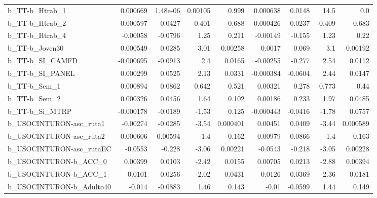\begin{tabular}{lrrrrrrrr}
b\_TT-b\_Htrab\_1             &    0.000669 &     1.48e-06 &  0.00105 &    0.999 &   0.000638 &      0.0148 &         14.5 &           0.0 \\
b\_TT-b\_Htrab\_2             &    0.000597 &       0.0427 &   -0.401 &    0.688 &   0.000426 &      0.0237 &       -0.409 &         0.683 \\
b\_TT-b\_Htrab\_4             &    -0.00058 &      -0.0796 &     1.25 &    0.211 &   -0.00149 &      -0.155 &         1.23 &          0.22 \\
b\_TT-b\_Joven30             &    0.000549 &       0.0285 &     3.01 &  0.00258 &     0.0017 &       0.069 &          3.1 &       0.00192 \\
b\_TT-b\_SI\_CAMFD            &   -0.000695 &      -0.0913 &      2.4 &   0.0165 &   -0.00255 &      -0.277 &         2.54 &        0.0112 \\
b\_TT-b\_SI\_PANEL            &    0.000299 &       0.0525 &     2.13 &   0.0331 &  -0.000384 &     -0.0604 &         2.44 &        0.0147 \\
b\_TT-b\_Sem\_1               &    0.000894 &       0.0862 &    0.642 &    0.521 &    0.00321 &       0.278 &        0.773 &          0.44 \\
b\_TT-b\_Sem\_2               &    0.000326 &       0.0456 &     1.64 &    0.102 &    0.00186 &       0.233 &         1.97 &        0.0485 \\
b\_TT-b\_Si\_MTRP             &   -0.000178 &      -0.0189 &    -1.53 &    0.125 &  -0.000443 &     -0.0416 &        -1.78 &        0.0757 \\
b\_USOCINTURON-asc\_ruta1    &    -0.00274 &      -0.0285 &    -3.54 & 0.000401 &    0.00451 &      0.0409 &        -3.44 &      0.000589 \\
b\_USOCINTURON-asc\_ruta2    &   -0.000606 &     -0.00594 &     -1.4 &    0.162 &    0.00979 &      0.0866 &         -1.4 &         0.163 \\
b\_USOCINTURON-asc\_rutaEC   &     -0.0553 &       -0.228 &    -3.06 &  0.00221 &    -0.0543 &      -0.218 &        -3.05 &       0.00228 \\
b\_USOCINTURON-b\_ACC\_0      &     0.00399 &       0.0103 &    -2.42 &   0.0155 &    0.00705 &      0.0213 &        -2.88 &       0.00394 \\
b\_USOCINTURON-b\_ACC\_1      &      0.0101 &       0.0256 &    -2.02 &   0.0431 &     0.0126 &      0.0369 &        -2.36 &        0.0181 \\
b\_USOCINTURON-b\_Adulto40   &      -0.014 &      -0.0883 &     1.46 &    0.143 &      -0.01 &     -0.0599 &         1.44 &         0.149 \\

\end{tabular}
